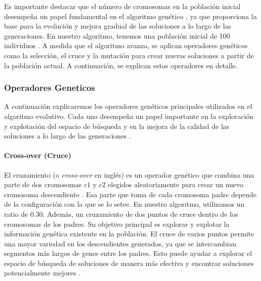Es importante destacar que el número de cromosomas en la población inicial
desempeña un papel fundamental en el algoritmo genético , ya que proporciona la base para la evolución y mejora gradual de las
soluciones a lo largo de las generaciones. En nuestro algoritmo, tenemos una
población inicial de 100 individuos . A medida que el algoritmo avanza, se
aplican operadores genéticos como la selección, el cruce  y
la mutación para crear nuevas soluciones  a partir de la población actual. A continuación, se explican estos operadores en detalle.

\subsubsection{Operadores Geneticos }

A continuación explicaremos los operadores genéticos principales utilizados en
el algoritmo evolutivo. Cada uno desempeña un papel importante en la exploración
y explotación  del espacio de búsqueda y en la mejora de la
calidad de las soluciones a lo largo de las generaciones
.

\paragraph{Cross-over (Cruce)}

El cruzamiento (o \emph{cross-over} en inglés) es un operador genético que
combina una parte de dos cromosomas $c1$ y $c2$ elegidos aleatoriamente para
crear un nuevo cromosoma descendiente . Esa parte que toma de cada cromosoma padre
depende de la configuración con la que se lo setee. En nuestro algoritmo,
utilizamos un ratio de 0.30. Además, un cruzamiento de dos puntos  de cruce dentro de los cromosomas de los padres. Su objetivo principal es explorar y explotar la información genética existente en la población.
El cruce de varios puntos permite una mayor variedad en los descendientes
generados, ya que se intercambian segmentos más largos de genes entre los
padres. Esto puede ayudar a explorar el espacio de búsqueda de soluciones de
manera más efectiva y encontrar soluciones potencialmente mejores .

